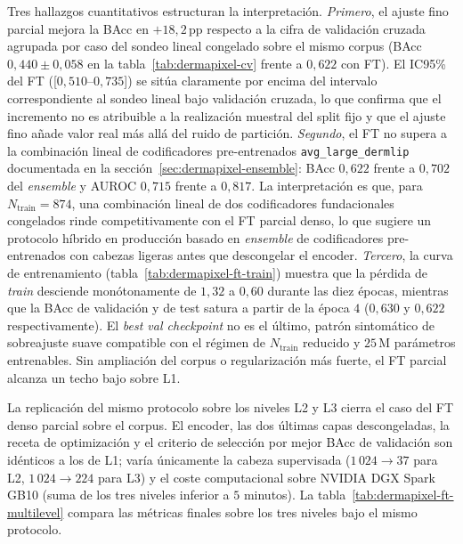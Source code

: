 Tres hallazgos cuantitativos estructuran la interpretación.
\textit{Primero}, el ajuste fino parcial mejora la BAcc en
$+18{,}2$\,pp respecto a la cifra de validación cruzada agrupada
por caso del sondeo lineal congelado sobre el mismo corpus
(BAcc $0{,}440 \pm 0{,}058$ en la
tabla~\ref{tab:dermapixel-cv} frente a $0{,}622$ con FT). El
IC95\% del FT ([$0{,}510$--$0{,}735$]) se sitúa claramente por
encima del intervalo correspondiente al sondeo lineal bajo
validación cruzada, lo que confirma que el incremento no es
atribuible a la realización muestral del split fijo y que el
ajuste fino añade valor real más allá del ruido de partición.
\textit{Segundo}, el FT no supera a la combinación lineal de
codificadores pre-entrenados \texttt{avg\_large\_dermlip}
documentada en la secci\'on~\ref{sec:dermapixel-ensemble}: BAcc
$0{,}622$ frente a $0{,}702$ del \emph{ensemble} y AUROC
$0{,}715$ frente a $0{,}817$. La interpretación es que, para
$N_{\mathrm{train}} = 874$, una combinación lineal de dos
codificadores fundacionales congelados rinde competitivamente con
el FT parcial denso, lo que sugiere un protocolo híbrido en
producción basado en \emph{ensemble} de codificadores
pre-entrenados con cabezas ligeras antes que descongelar el
encoder. \textit{Tercero}, la curva de entrenamiento
(tabla~\ref{tab:dermapixel-ft-train}) muestra que la pérdida de
\emph{train} desciende monótonamente de $1{,}32$ a $0{,}60$
durante las diez épocas, mientras que la BAcc de validación y de
test satura a partir de la época $4$ ($0{,}630$ y $0{,}622$
respectivamente). El \emph{best val checkpoint} no es el último,
patrón sintomático de sobreajuste suave compatible con el régimen
de $N_{\mathrm{train}}$ reducido y $25$\,M parámetros
entrenables. Sin ampliación del corpus o regularización más
fuerte, el FT parcial alcanza un techo bajo sobre L1.

La replicación del mismo protocolo sobre los niveles L2 y L3 cierra
el caso del FT denso parcial sobre el corpus. El encoder, las dos
últimas capas descongeladas, la receta de optimización y el
criterio de selección por mejor BAcc de validación son idénticos a
los de L1; varía únicamente la cabeza supervisada ($1\,024 \to 37$
para L2, $1\,024 \to 224$ para L3) y el coste computacional sobre
NVIDIA DGX Spark GB10 (suma de los tres niveles inferior a $5$
minutos). La tabla~\ref{tab:dermapixel-ft-multilevel} compara las
métricas finales sobre los tres niveles bajo el mismo protocolo.


